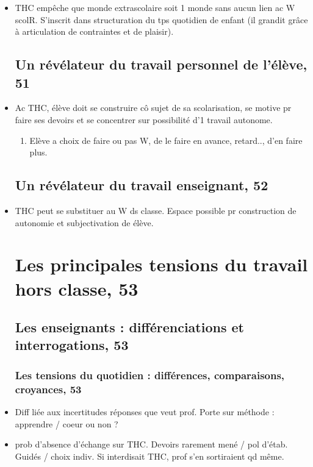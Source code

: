 \documentclass[12pt]{article}
\begin{document}
\begin{itemize}[label=]
\item THC empêche que monde extrascolaire soit 1 monde sans aucun lien ac W scolR. S'inscrit dans structuration du tps quotidien de enfant (il grandit grâce à articulation de contraintes et de plaisir). 

\subsection{Un révélateur du travail personnel de l'élève, 51}

\item Ac THC, élève doit se construire cô sujet de sa scolarisation, se motive pr faire ses devoirs et se concentrer sur possibilité d'1 travail autonome. \\
\begin{enumerate}
\item Elève a choix de faire ou pas W, de le faire en avance, retard.., d'en faire plus.
\end{enumerate}

\subsection{Un révélateur du travail enseignant, 52}
\item THC peut se substituer au W ds classe. Espace possible pr construction de autonomie et subjectivation de élève.

\section{Les principales tensions du travail hors classe, 53}

\subsection{Les enseignants : différenciations et interrogations, 53}
\subsubsection{Les tensions du quotidien : différences, comparaisons, croyances, 53}

\item Diff liée aux incertitudes réponses que veut prof. Porte sur méthode : apprendre / coeur ou non ?\\

\item prob d'absence d'échange sur THC. Devoirs rarement mené / pol d'étab.  Guidés / choix indiv. Si interdisait THC, prof s'en sortiraient qd même. \\


\end{itemize}
\end{document}
